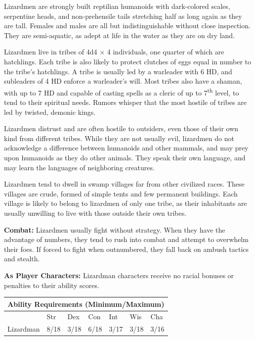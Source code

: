 \begin{multicols}{2}
\begin{minipage}{\columnwidth}
\end{minipage}

Lizardmen are strongly built reptilian humanoids with dark-colored scales, serpentine heads, and non-prehensile tails stretching half as long again as they are tall. Females and males are all but indistinguishable without close inspection. They are semi-aquatic, as adept at life in the water as they are on dry land.

Lizardmen live in tribes of 4d4 $\times$ 4 individuals, one quarter of which are hatchlings. Each tribe is also likely to protect clutches of eggs equal in number to the tribe's hatchlings. A tribe is usually led by a warleader with 6 HD, and subleaders of 4 HD enforce a warleader's will. Most tribes also have a shaman, with up to 7 HD and capable of casting spells as a cleric of up to 7\textsuperscript{th} level, to tend to their spiritual needs. Rumors whisper that the most hostile of tribes are led by twisted, demonic kings.

Lizardmen distrust and are often hostile to outsiders, even those of their own kind from different tribes. While they are not usually evil, lizardmen do not acknowledge a difference between humanoids and other mammals, and may prey upon humanoids as they do other animals. They speak their own language, and may learn the languages of neighboring creatures.

Lizardmen tend to dwell in swamp villages far from other civilized races. These villages are crude, formed of simple tents and few permanent buildings. Each village is likely to belong to lizardmen of only one tribe, as their inhabitants are usually unwilling to live with those outside their own tribes.

\textbf{Combat:} Lizardmen usually fight without strategy. When they have the advantage of numbers, they tend to rush into combat and attempt to overwhelm their foes. If forced to fight when outnumbered, they fall back on ambush tactics and stealth.

\textbf{As Player Characters:} Lizardman characters receive no racial bonuses or penalties to their ability scores.

\noindent \begin{minipage}{\columnwidth}

\noindent \begin{tabular}{|p{}|p{}|p{}|p{}|p{}|p{}|p{}|}
\multicolumn{7}{c}{Ability Requirements (Minimum/Maximum)} \\
\hline
	& Str	& Dex	& Con	& Int	& Wis	& Cha	\\
\hline\hline
\rowcolor[gray]{.9}Lizardman	& 8/18	& 3/18	& 6/18	& 3/17	& 3/18	& 3/16	\\
\hline
\end{tabular}


\end{minipage}
\end{multicols}
